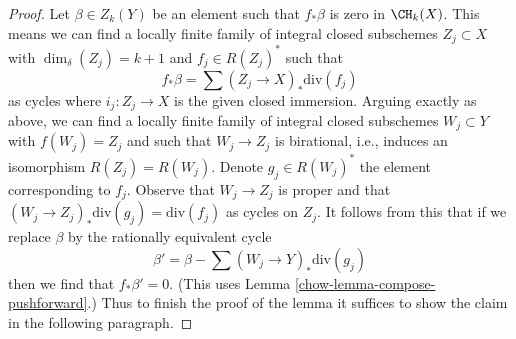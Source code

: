\begin{proof}
\medskip\noindent
Let $\beta \in Z_k(Y)$ be an element such that $f_*\beta$ is zero in
$\CH_k(X)$. This means we can find a locally finite family of
integral closed subschemes $Z_j \subset X$ with $\dim_\delta(Z_j) = k + 1$
and $f_j \in R(Z_j)^*$ such that
$$
f_*\beta = \sum (Z_j \to X)_*\text{div}(f_j)
$$
as cycles where $i_j : Z_j \to X$ is the given closed immersion.
Arguing exactly as above, we can find a locally finite
family of integral closed subschemes $W_j \subset Y$
with $f(W_j) = Z_j$ and such that $W_j \to Z_j$ is birational, i.e.,
induces an isomorphism $R(Z_j) = R(W_j)$. Denote $g_j \in R(W_j)^*$
the element corresponding to $f_j$. Observe that $W_j \to Z_j$
is proper and that $(W_j \to Z_j)_*\text{div}(g_j) = \text{div}(f_j)$
as cycles on $Z_j$. It follows from this that if we replace
$\beta$ by the rationally equivalent cycle
$$
\beta' = \beta - \sum (W_j \to Y)_*\text{div}(g_j)
$$
then we find that $f_*\beta' = 0$.
(This uses Lemma \ref{chow-lemma-compose-pushforward}.)
Thus to finish the proof
of the lemma it suffices to show the claim in the following paragraph.


\end{proof}
